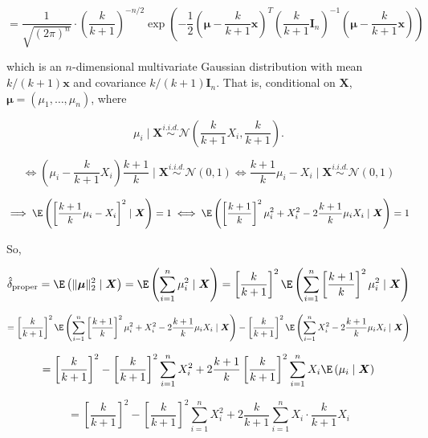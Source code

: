 \begin{solution}
\begin{enumerate}[(a)]
\[
=
 \frac{1}{\sqrt{(2 \pi)^n}}  \cdot \left( \frac{k}{k+1} \right)^{-n/2}   \exp \left(-  \frac{1}{2}   \left( \boldsymbol{\mu} -  \frac{k}{k+1}  \boldsymbol{x} \right) ^T \left( \frac{k}{k+1}\boldsymbol{I}_n \right)^{-1} \left( \boldsymbol{\mu} -  \frac{k}{k+1} \boldsymbol{x} \right)  \right)
 \]
 
which is an \(n\)-dimensional multivariate Gaussian distribution with mean \(k/(k+1) \boldsymbol{x}\) and covariance \(k/(k+1) \boldsymbol{I}_n\). That is, conditional on \(\boldsymbol{X}\), \(\boldsymbol{\mu} = (\mu_1, \ldots, \mu_n)\), where

\[
\mu_i \mid \boldsymbol{X}  \overset{i.i.d.}{\sim} \mathcal{N} \left( \frac{k}{k+1} X_i, \frac{k}{k+1}\right).
\]

\[
\iff \left( \mu_i - \frac{k}{k+1}  X_i \right) \frac{k+1}{k}  \mid \boldsymbol{X}\overset{i.i.d.}{\sim} \mathcal{N} \left(0, 1\right) \iff \frac{k+1}{k} \mu_i -   X_i  \mid \boldsymbol{X} \overset{i.i.d.}{\sim} \mathcal{N} \left(0, 1\right)
\]

\begin{equation}
\implies  \E \left( \left[ \frac{k+1}{k} \mu_i -   X_i \right]^2  \mid \boldsymbol{X}  \right) = 1  \iff   \E \left( \left[ \frac{k+1}{k} \right]^2 \mu_i  ^2  + X_i^2 - 2 \frac{k+1}{k} \mu_i X_i  \mid \boldsymbol{X}  \right) = 1 
\end{equation}

So,

\[
\hat{\delta}_{\text{proper}} = \E \left( \lVert \boldsymbol{\mu} \rVert_2^2 \mid \boldsymbol{X} \right) = \E \left( \sum_{i=1}^n \mu_i^2 \mid \boldsymbol{X}  \right) = \left[ \frac{k}{k+1} \right]^2 \E \left( \sum_{i=1}^n \left[ \frac{k+1}{k} \right]^2 \mu_i^2 \mid \boldsymbol{X}  \right)
\]

\[
= \left[ \frac{k}{k+1} \right]^2 \E \left( \sum_{i=1}^n \left[ \frac{k+1}{k} \right]^2 \mu_i  ^2  + X_i^2 - 2 \frac{k+1}{k} \mu_i X_i  \mid \boldsymbol{X}  \right)  -  \left[ \frac{k}{k+1} \right]^2 \E \left( \sum_{i=1}^n X_i^2 - 2 \frac{k+1}{k} \mu_i X_i  \mid \boldsymbol{X}  \right) 
\] 

\[
= \left[ \frac{k}{k+1} \right]^2  - \left[ \frac{k}{k+1} \right]^2 \sum_{i=1}^n X_i^2 + 2 \frac{k+1}{k} \left[ \frac{k}{k+1} \right]^2   \sum_{i=1}^n X_i   \E \left( \mu_i \mid \boldsymbol{X}  \right) 
\] 

\[
= \left[ \frac{k}{k+1} \right]^2  - \left[ \frac{k}{k+1} \right]^2 \sum_{i=1}^n X_i^2 + 2 \frac{k}{k+1} \sum_{i=1}^n    X_i   \cdot \frac{k}{k+1} X_i
\] 


\end{enumerate}
\end{solution}
